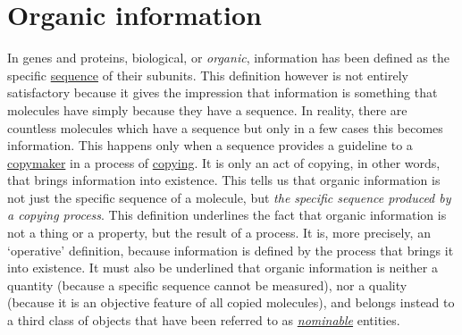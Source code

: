 \documentclass[12pt]{article}
\begin{document}
\section{Organic information}
In genes and proteins, biological, or \textit{organic}, information has been defined as the specific \hyperlink{sequences}{sequence} of their subunits. This definition however is not entirely satisfactory because it gives the impression that information is something that molecules have simply because they have a sequence. In reality, there are countless molecules which have a sequence but only in a few cases this becomes information. This happens only when a sequence provides a guideline to a \hyperlink{copymakers}{copymaker} in a process of \hyperlink{copying_and_coding}{copying}. It is only an act of copying, in other words, that brings information into existence. This tells us that organic information is not just the specific sequence of a molecule, but \textit{the specific sequence produced by a copying process}. This definition underlines the fact that organic information is not a thing or a property, but the result of a process. It is, more precisely, an `operative' definition, because information is defined by the process that brings it into existence. It must also be underlined that organic information is neither a \hypertarget{physical_quantities}{quantity} (because a specific sequence cannot be measured), nor a quality (because it is an objective feature of all copied molecules), and belongs instead to a third class of objects that have been referred to as \hyperlink{nominable_entity}{\textit{nominable}} entities.


\hypertarget{organic_meaning}{}
\end{document}
